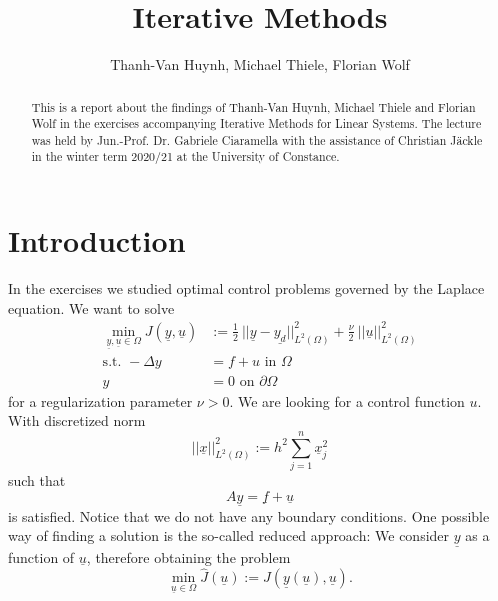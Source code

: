\documentclass{amsart}
\theoremstyle{definition}
\theoremstyle{remark}
\numberwithin{equation}{section}
\begin{document}
\title{Iterative Methods}

\author{Thanh-Van Huynh, Michael Thiele, Florian Wolf}


\begin{abstract}
	This is a report about the findings of Thanh-Van Huynh, Michael Thiele and Florian Wolf in the exercises accompanying Iterative Methods for Linear Systems. The lecture was held by Jun.-Prof. Dr. Gabriele Ciaramella with the assistance of Christian J\"ackle in the winter term 2020/21 at the University of Constance.
\end{abstract}

\maketitle

\tableofcontents



\section{Introduction}
In the exercises we studied optimal control problems governed by the Laplace equation. We want to solve
\begin{align}
\min\limits_{\underline{y},\underline{u}\in\Omega} J(\underline{y},\underline{u}) &:= \frac{1}{2}\ ||\underline{y}-\underline{y_d}||_{L^2(\Omega)}^2 + \frac{\nu}{2}\ ||\underline{u}||_{L^2(\Omega)}^2\\
\text{s.t. } -\Delta y &= f+ u \text{ in } \Omega\\
y &= 0 \text{ on } \partial\Omega
\label{eq:OptimalControlProblem}
\end{align}
for a regularization parameter $\nu > 0$. We are looking for a control function $u$. With discretized norm
\begin{equation*}
||\underline{x}||_{L^2(\Omega)}^2 := h^2 \sum\limits_{j=1}^n \underline{x}_j^2
\end{equation*}
such that
\begin{equation*}
A\underline{y}=\underline{f}+\underline{u}
\end{equation*}
is satisfied. Notice that we do not have any boundary conditions. One possible way of finding a solution is the so-called reduced approach: We consider $\underline{y}$ as a function of $\underline{u}$, therefore obtaining the problem
\begin{equation*}
\min\limits_{\underline{u}\in\Omega} \hat{J}(\underline{u}) := J(\underline{y}(\underline{u}),\underline{u}).
\end{equation*}
\end{document}
